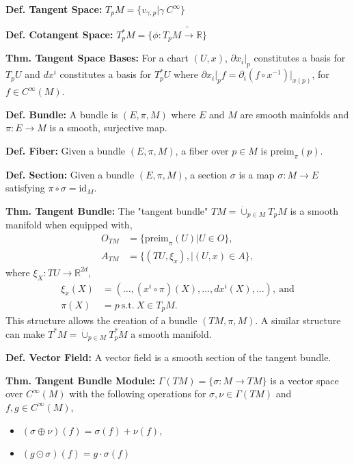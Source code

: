 \documentclass[12pt]{article}
\begin{document}
\begin{multicols}{2}
  \noindent
  \textbf{Def. Tangent Space:} $T_{p}M = \{v_{\gamma, p} | \gamma \ C^{\infty}\}$

  \noindent
  \textbf{Def. Cotangent Space:} $T^{*}_{p}M = \{\phi: T_pM \tilde{\rightarrow} \mathbb{R}\}$

  \noindent
  \textbf{Thm. Tangent Space Bases:} For a chart $(U, x)$, $\partial x_i \lvert_p$ constitutes a basis for $T_{p}U$
  and $d x^i$ constitutes a basis for $T^{*}_{p}U$ where $\partial x_i \lvert_p f = \partial_i (f \circ x^{-1})\lvert_{x(p)}$,
  for $f \in C^{\infty}(M)$.

  \noindent
  \textbf{Def. Bundle:} A bundle is $(E, \pi, M)$ where $E$ and $M$
  are smooth mainfolds and $\pi: E \rightarrow M$ is a smooth, surjective map.

  \noindent
  \textbf{Def. Fiber:} Given a bundle $(E, \pi, M)$, a fiber over $p \in M$
  is $\textrm{preim}_\pi({p})$.

  \noindent
  \textbf{Def. Section:} Given a bundle $(E, \pi, M)$, a section $\sigma$ is
  a map $\sigma: M \rightarrow E$ satisfying $\pi \circ \sigma = \textrm{id}_M$.

  \noindent
  \textbf{Thm. Tangent Bundle:} The "tangent bundle"
  $TM = \dot{\cup}_{p \in M} T_pM$ is a smooth manifold
  when equipped with,
  \begin{align}
  O_{TM} &= \{\textrm{preim}_{\pi}(U) | U \in O\},\\
  A_{TM} &= \{(TU, \xi_x), | (U, x) \in A\},
  \end{align}
  where $\xi_X: TU \rightarrow \mathbb{R}^{2d}$,
  \begin{align}
  \xi_x(X) &= (\dots, (x^i \circ \pi)(X), \dots, dx^i(X), \dots), \ \textrm{and}\\
  \pi(X) &= p \ \textrm{s.t.} \ X \in T_pM.
  \end{align}
  This structure allows the creation of a bundle $(TM, \pi, M)$.
  A similar structure can make $T^*M = \dot{\cup}_{p \in M} T_p^*M$
  a smooth manifold.

  \noindent
  \textbf{Def. Vector Field:}
  A vector field is a smooth section of the tangent bundle.

  \noindent
  \textbf{Thm. Tangent Bundle Module:}
  $\Gamma(TM) = \{\sigma : M \rightarrow TM\}$ is a vector space over
  $C^{\infty}(M)$ with the following operations for $\sigma, \nu \in \Gamma(TM)$
  and $f, g \in C^{\infty}(M)$,
  \begin{itemize}
  \item $(\sigma \oplus \nu)(f) = \sigma(f) + \nu(f)$,
  \item $(g \odot \sigma)(f) = g \cdot \sigma(f)$
  \end{itemize}


\end{multicols}
\end{document}
